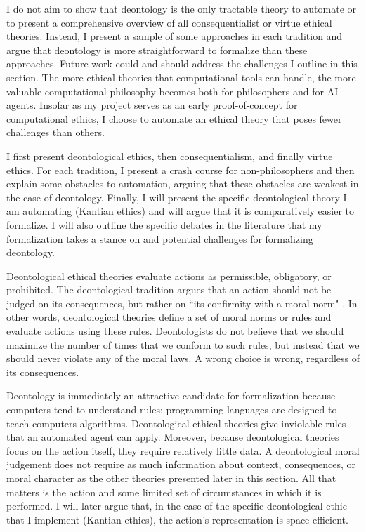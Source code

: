 \begin{isabellebody}
\begin{isamarkuptext}
I do not aim to show that deontology is the only tractable theory to automate or
to present a comprehensive overview of all consequentialist or virtue ethical theories. Instead, I 
present a sample of some approaches in each tradition and argue that deontology is more straightforward 
to formalize than these approaches. Future work could and should address the challenges I outline in 
this section. The more ethical theories that computational tools can handle, the more valuable 
computational philosophy becomes both for philosophers and for AI agents. Insofar as my project serves 
as an early proof-of-concept for computational ethics, I choose to automate an ethical theory that 
poses fewer challenges than others.

I first present deontological ethics, then consequentialism, and finally virtue ethics. For each 
tradition, I present a crash course for non-philosophers and then explain some obstacles to automation, 
arguing that these obstacles are weakest in the case of deontology. Finally, I will present the specific 
deontological theory I am automating (Kantian ethics) and will argue that it is comparatively easier
to formalize. I will also outline the specific debates in the literature that my formalization takes
a stance on and potential challenges for formalizing deontology.%
\end{isamarkuptext}\isamarkuptrue%
%
\isadelimdocument
%
\endisadelimdocument
%
\isatagdocument
%
\isamarkuptrue%
%
\endisatagdocument
{\isafolddocument}%
%
\isadelimdocument
%
\endisadelimdocument
%
\begin{isamarkuptext}%
Deontological ethical theories evaluate actions as permissible, obligatory, or prohibited. The 
deontological tradition argues that an action should not be judged on its consequences, 
but rather on ``its confirmity with a moral norm" \citep{sepdeont}. In other words, deontological theories
define a set of moral norms or rules and evaluate actions using
these rules. Deontologists do not believe that we should maximize the number of times that we 
conform to such rules, but instead that we should never violate any of the moral laws. A wrong
choice is wrong, regardless of its consequences.%
\end{isamarkuptext}\isamarkuptrue%
%
\begin{isamarkuptext}%
Deontology is immediately an attractive candidate for formalization because computers tend to 
understand rules; programming languages are designed to teach computers algorithms. Deontological
ethical theories give inviolable rules that an automated agent can apply. Moreover, because deontological 
theories focus on
the action itself, they require relatively little data. A deontological moral judgement does not require
as much information about context, consequences, or moral character as the other theories presented later in this
section. All that matters is the action and some limited set of circumstances in which it is performed.
I will later argue that, in the case of the specific deontological ethic that I implement (Kantian ethics), 
the action's representation is space efficient. 


\end{isamarkuptext}
\end{isabellebody}
